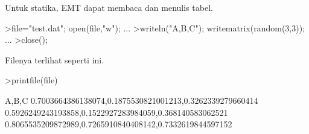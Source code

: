 \documentclass{article}
\begin{document}
\begin{eulernotebook}
\begin{eulercomment}
\begin{eulercomment}
\begin{eulercomment}
Untuk statika, EMT dapat membaca dan menulis tabel.
\end{eulercomment}
\begin{eulerprompt}
>file="test.dat"; open(file,"w"); ...
>writeln("A,B,C"); writematrix(random(3,3)); ...
>close();
\end{eulerprompt}
\begin{eulercomment}
Filenya terlihat seperti ini.
\end{eulercomment}
\begin{eulerprompt}
>printfile(file)
\end{eulerprompt}
\begin{euleroutput}
  A,B,C
  0.7003664386138074,0.1875530821001213,0.3262339279660414
  0.5926249243193858,0.1522927283984059,0.368140583062521
  0.8065535209872989,0.7265910840408142,0.7332619844597152
  

\end{euleroutput}
\end{eulercomment}
\end{eulercomment}
\end{eulernotebook}
\end{document}
